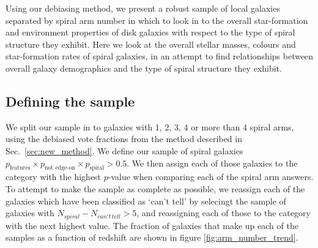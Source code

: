 \documentclass[useAMS,usenatbib]{mn2e}
\begin{document}
Using our debiasing method, we present a robust sample of local galaxies separated by spiral arm number in which to look in to the overall star-formation and environment properties of disk galaxies with respect to the type of spiral structure they exhibit. Here we look at the overall stellar masses, colours and star-formation rates of spiral galaxies, in an attempt to find relationships between overall galaxy demographics and the type of spiral structure they exhibit.

\subsection{Defining the sample}
\label{sec:defining_the_sample}

We split our sample in to galaxies with 1, 2, 3, 4 or more than 4 spiral arms, using the debiased vote fractions from the method described in Sec.~\ref{sec:new_method}. We define our sample of spiral galaxies  $p_{\textrm{features}} \times p_{\textrm{not edge-on}} \times p_{\textrm{spiral}} > 0.5$. We then assign each of those galaxies to the category with the highest $p$-value when comparing each of the spiral arm answers. To attempt to make the sample as complete as possible, we reassign each of the galaxies which have been classified as `can't tell' by selecingt the sample of galaxies with $N_{spiral} - N_{can't \, tell} > 5$, and reassigning each of those to the category with the next highest value. The fraction of galaxies that make up each of the samples as a function of redshift are shown in figure \ref{fig:arm_number_trend}. 
\end{document}
